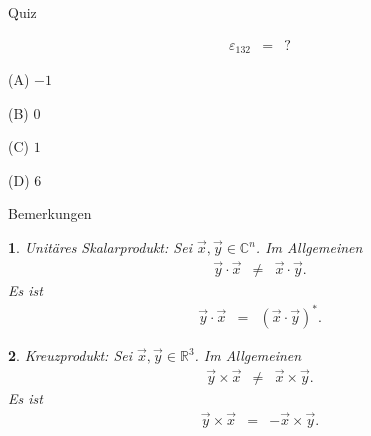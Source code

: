 \documentclass[german]{beamer}
\newcommand{\bq}{\begin{eqnarray*}}
\newcommand{\eq}{\end{eqnarray*}}
\newcommand{\eps}{\varepsilon}
\newtheorem*{myemptytheorem}{}
\begin{document}
\begin{frame}{Quiz}

\bq
 \eps_{132}
 & = & ?
\eq
\begin{description}
\item{(A)} $-1$
\item{(B)} $0$
\item{(C)} $1$
\item{(D)} $6$
\end{description}

\end{frame}

\begin{frame}{Bemerkungen}

\begin{myemptytheorem}
Unit\"ares Skalarprodukt: Sei $\vec{x}, \vec{y} \in \mathbb{C}^n$.
Im Allgemeinen
\bq
 \vec{y} \cdot \vec{x} & \neq & \vec{x} \cdot \vec{y}.
\eq
Es ist
\bq
 \vec{y} \cdot \vec{x} & = & \left( \vec{x} \cdot \vec{y} \right)^\ast.
\eq
\end{myemptytheorem}
\begin{myemptytheorem}
Kreuzprodukt: Sei $\vec{x}, \vec{y} \in \mathbb{R}^3$.
Im Allgemeinen
\bq
 \vec{y} \times \vec{x} & \neq & \vec{x} \times \vec{y}.
\eq
Es ist
\bq
 \vec{y} \times \vec{x} & = & - \vec{x} \times \vec{y}.
\eq
\end{myemptytheorem}

\end{frame}


\begin{frame}

\end{frame}
\end{document}
